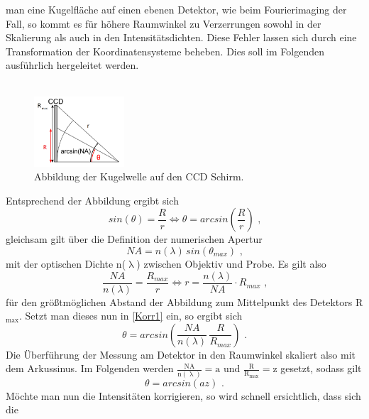 man eine Kugelfläche auf einen ebenen Detektor, wie beim Fourierimaging der
Fall, so kommt es für höhere Raumwinkel zu Verzerrungen sowohl in der Skalierung
als auch in den Intensitätsdichten. Diese Fehler lassen sich durch eine
Transformation der Koordinatensysteme beheben. Dies soll im Folgenden
ausführlich hergeleitet werden. \\ \\ \begin{figure}[h] \centering
\includegraphics[width=0.3\textwidth]{Bilder/Anhang/arcsin}
\caption[Fourier-Korrektur]{Abbildung der Kugelwelle auf den CCD Schirm.}
\end{figure} Entsprechend der Abbildung ergibt sich \begin{equation}
sin(\theta)=\frac{R}{r} \Longleftrightarrow \theta =
arcsin\left(\frac{R}{r}\right) \text{ ,} \label{Korr1} \end{equation} gleichsam
gilt über die Definition der numerischen Apertur \begin{equation} NA=n(\lambda)
\, sin(\theta_{max}) \text{ ,} \end{equation} mit der optischen Dichte
n($\uplambda$) zwischen Objektiv und Probe. Es gilt also \begin{equation}
\frac{NA}{n(\lambda)}=\frac{R_{max}}{r} \Longleftrightarrow
r=\frac{n(\lambda)}{NA} \cdot R_{max} \text{ ,} \end{equation} für den
größtmöglichen Abstand der Abbildung zum Mittelpunkt des Detektors
R$_\text{max}$. Setzt man dieses nun in \autoref{Korr1} ein, so ergibt sich
\begin{equation} \theta=arcsin\left(\frac{NA}{n(\lambda)}\,
\frac{R}{R_{max}}\right)\text{ .} \label{Korr4} \end{equation} Die Überführung
der Messung am Detektor in den Raumwinkel skaliert also mit dem Arkussinus. Im
Folgenden werden $\frac{\text{NA}}{\text{n}(\uplambda)}=\text{a}$ und
$\frac{\text{R}}{\text{R}_\text{max}}=\text{z}$ gesetzt, sodass gilt
\begin{equation} \theta=arcsin\left(az\right) \text{ .} \end{equation} Möchte
man nun die Intensitäten korrigieren, so wird schnell ersichtlich, dass sich die
